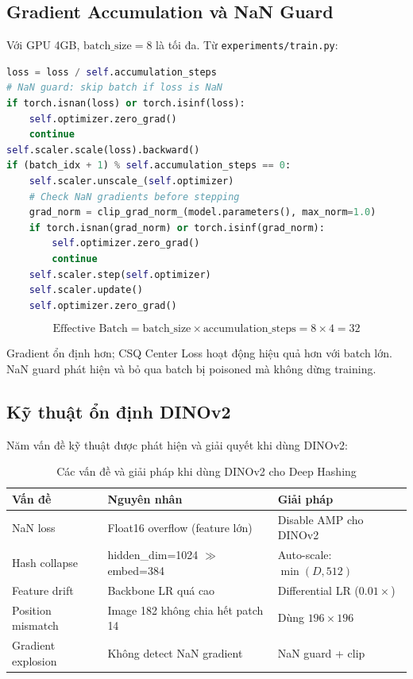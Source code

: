 \documentclass[13pt,a4paper]{article}
\begin{document}
\subsection{Gradient Accumulation và NaN Guard}

Với GPU 4GB, $\text{batch\_size} = 8$ là tối đa. Từ \texttt{experiments/train.py}:

\begin{lstlisting}[language=Python, caption={Gradient accumulation + NaN guard}]
loss = loss / self.accumulation_steps
# NaN guard: skip batch if loss is NaN
if torch.isnan(loss) or torch.isinf(loss):
    self.optimizer.zero_grad()
    continue
self.scaler.scale(loss).backward()
if (batch_idx + 1) % self.accumulation_steps == 0:
    self.scaler.unscale_(self.optimizer)
    # Check NaN gradients before stepping
    grad_norm = clip_grad_norm_(model.parameters(), max_norm=1.0)
    if torch.isnan(grad_norm) or torch.isinf(grad_norm):
        self.optimizer.zero_grad()
        continue
    self.scaler.step(self.optimizer)
    self.scaler.update()
    self.optimizer.zero_grad()
\end{lstlisting}

\begin{equation}
\text{Effective Batch} = \text{batch\_size} \times \text{accumulation\_steps} = 8 \times 4 = 32
\end{equation}

Gradient ổn định hơn; CSQ Center Loss hoạt động hiệu quả hơn với batch lớn. NaN guard phát hiện và bỏ qua batch bị poisoned mà không dừng training.


\subsection{Kỹ thuật ổn định DINOv2}
\label{sec:dinov2_stabilization}

Năm vấn đề kỹ thuật được phát hiện và giải quyết khi dùng DINOv2:

\begin{table}[H]
\centering
\caption{Các vấn đề và giải pháp khi dùng DINOv2 cho Deep Hashing}
\label{tab:dinov2_issues}
\begin{tabular}{p{3cm}p{4.5cm}p{4.5cm}}
\toprule
\textbf{Vấn đề} & \textbf{Nguyên nhân} & \textbf{Giải pháp} \\
\midrule
NaN loss              & Float16 overflow (feature lớn)     & Disable AMP cho DINOv2 \\
Hash collapse         & hidden\_dim=1024 $\gg$ embed=384   & Auto-scale: $\min(D, 512)$ \\
Feature drift         & Backbone LR quá cao               & Differential LR ($0.01\times$) \\
Position mismatch     & Image 182 không chia hết patch 14  & Dùng $196\times196$ \\
Gradient explosion    & Không detect NaN gradient          & NaN guard + clip \\
\bottomrule
\end{tabular}
\end{table}
\end{document}
